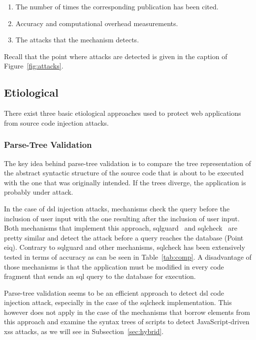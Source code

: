 \documentclass[conference]{IEEEtran}
\begin{document}
\begin{enumerate}
\item The number of times the corresponding publication has been cited.
\item Accuracy and computational overhead measurements.
\item The attacks that the mechanism detects.
\end{enumerate}

Recall that the point where attacks are detected is given in the
caption of Figure~\ref{fig:attacks}.

\subsection{Etiological}
\label{sec:prot}

There exist three basic etiological approaches used to protect web
applications from source code injection attacks.

\subsubsection{Parse-Tree Validation}
\label{sec:tree}

The key idea behind parse-tree validation is to compare the tree
representation of the abstract syntactic structure of the source code
that is about to be executed with the one that was originally
intended. If the trees diverge, the application is probably under
attack.

In the case of {\sc dsl} injection attacks, mechanisms check 
the query before the inclusion of user input with the one
resulting after the inclusion of user input.
Both mechanisms that implement this approach,
{\sc sqlg}uard~\cite{BWS05} and
{\sc sql}check~\cite{SW06} are pretty similar
and detect the attack before a query reaches the
database (Point {\sc e}i{\sc q}).
Contrary to {\sc sqlg}uard and other
mechanisms, {\sc sql}check has been
extensively tested in terms of accuracy
as can be seen in Table~\ref{tab:comp}.
A disadvantage of those mechanisms is that the
application must be modified in every code fragment
that sends an {\sc sql} query to the database for execution.

Parse-tree validation seems to be an efficient approach
to detect {\sc dsl} code injection attack,
especially in the case of the {\sc sql}check
implementation. This however does not apply in
the case of the mechanisms that borrow elements from
this approach and examine the syntax trees
of scripts to detect JavaScript-driven {\sc xss} attacks,
as we will see in Subsection~\ref{sec:hybrid}.
\end{document}

